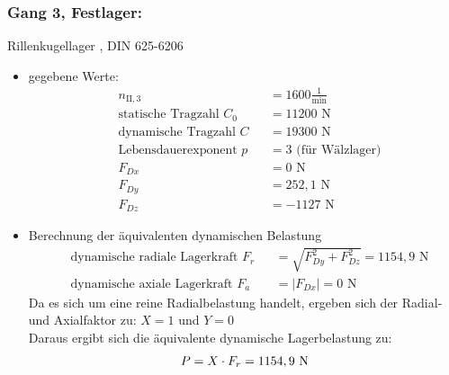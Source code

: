 \subsubsection{Gang 3, Festlager:} Rillenkugellager , DIN 625-6206\\
\begin{itemize}
	\item gegebene Werte:
	\begin{align*}
	&n_{{\mathord{\mathrm{II}},3}} &&=  1600 \frac{1}{\text{min}} \\
	&\text{statische Tragzahl } C_{0} &&= 11200 \text{ N}\\
	&\text{dynamische Tragzahl } C &&= 19300 \text{ N} \\
	&\text{Lebensdauerexponent } p &&= 3 \text{ (für Wälzlager)} \\
	&F_{Dx} && = 0\text{ N}\\
	&F_{Dy} && = 252,1 \text{ N}\\
	&F_{Dz} && = -1127 \text{ N}
	\end{align*} 
	\item Berechnung der äquivalenten dynamischen Belastung
	\begin{align*}
	&\text{dynamische radiale Lagerkraft } F_r&& = \sqrt{F_{Dy}^2 + F_{Dz}^2 } = 1154,9 \text{ N} \\
	&\text{dynamische axiale Lagerkraft } F_a&& = |F_{Dx}| = 0 \text{ N}
	\end{align*} 
	Da es sich um eine reine Radialbelastung handelt, ergeben sich der Radial- und Axialfaktor zu: $X= 1$ und $Y=0$\\
	Daraus ergibt sich die äquivalente dynamische Lagerbelastung zu:  
	\[
	P= X \cdot F_r =1154,9 \text{ N}
	\]
\end{itemize}

